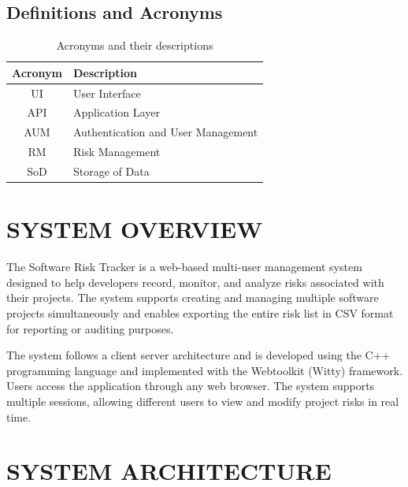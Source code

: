 \documentclass[letterpaper,12pt,oneside,listof=totoc,parskip=full]{scrreprt}
\begin{document}
\section{Definitions and Acronyms}

\begin{table}[!h]
\centering
\begin{tabular}{|c|p{}|}
\hline
Acronym & Description\\
\hline
UI & User Interface \\
\hline
API & Application Layer \\
\hline
AUM & Authentication and User Management \\
\hline
RM & Risk Management \\
\hline
SoD & Storage of Data \\
\hline
\end{tabular}
\label{table:acronyms}
\caption{Acronyms and their descriptions}
\end{table}





\chapter{SYSTEM OVERVIEW}
The Software Risk Tracker is a web-based multi-user management system designed to help developers record, monitor, and analyze risks associated with their projects.     The system supports creating and managing multiple software projects simultaneously and enables exporting the entire risk list in CSV format for reporting or auditing purposes. 

The system follows a client server architecture and is developed using the C++ programming language
and implemented with the Webtoolkit (Witty) framework. Users access the application through any web browser. The system supports multiple sessions, allowing different users to view and modify project risks in real time.


\chapter{SYSTEM ARCHITECTURE}
\end{document}
